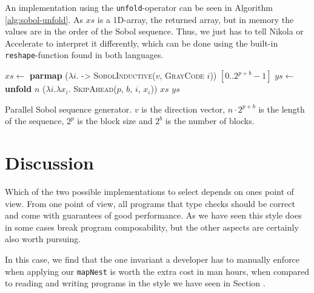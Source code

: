 An implementation using the \lstinline{unfold}-operator can be seen in
Algorithm \ref{alg:sobol-unfold}. As $xs$ is a 1D-array, the returned
array, but in memory the values are in the order of the Sobol
sequence. Thus, we just has to tell Nikola or Accelerate to interpret
it differently, which can be done using the built-in
\lstinline{reshape}-function found in both languages.

\begin{algorithm}
  \begin{algorithmic}
    \State $xs \gets$ \textbf{parmap} ($\lambda i$. -> \textsc{SobolInductive}($v$, \textsc{GrayCode} $i$)) $[0..2^{p+b}-1]$
    \State $ys \gets$ \textbf{unfold} $n$ ($\lambda i. \lambda x_i$. \textsc{SkipAhead}($p$, $b$, $i$, $x_i$)) $xs$
    \State \Return $ys$
    \EndFunction
  \end{algorithmic}
  \caption{Parallel Sobol sequence generator. $v$ is the direction
    vector, $n \cdot 2^{p+b}$ is the length of the sequence, $2^p$ is the block size
    and $2^b$ is the number of blocks.}
  \label{alg:sobol-unfold}
\end{algorithm}


\section{Discussion}
Which of the two possible implementations to select depends on ones
point of view. From one point of view, all programs that type checks
should be correct and come with guarantees of good performance. As we
have seen this style does in some cases break program composability,
but the other aspects are certainly also worth pursuing.

In this case, we find that the one invariant a developer has to
manually enforce when applying our \lstinline{mapNest} is worth the
extra cost in man hours, when compared to reading and writing programs
in the style we have seen in Section .

